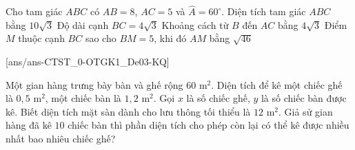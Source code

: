 \begin{ex}%
	Cho tam giác $ABC$ có $AB=8$, $AC=5$ và $\widehat{A}=60^\circ$. 
	\choiceTF
	{\True Diện tích tam giác $ABC$ bằng $10\sqrt{3}$}
	{Độ dài cạnh $BC=4\sqrt{3}$}
	{\True Khoảng cách từ $B$ đến $AC$ bằng $4\sqrt{3}$}
	{Điểm $M$ thuộc cạnh $BC$ sao cho $BM=5$, khi đó $AM$ bằng $\sqrt{46}$}
\end{ex}
[ans/ans-CTST_0-OTGK1_De03-KQ]
\caukq
\begin{ex}%
	Một gian hàng trưng bày bàn và ghế rộng $60$ m$^2$. Diện tích để kê một chiếc ghế là $0{,}5$ m$^2$, một chiếc bàn là $1{,}2$ m$^2$. Gọi $x$ là số chiếc ghế, $y$ là số chiếc bàn được kê. Biết diện tích mặt sàn dành cho lưu thông tối thiểu là $12$ m$^2$. Giả sử gian hàng đã kê $10$ chiếc bàn thì phần diện tích cho phép còn lại có thể kê được nhiều nhất bao nhiêu chiếc ghế?\\
\end{ex}
